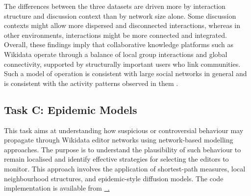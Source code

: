\documentclass[acmsmall,nonacm,natbib=false]{acmart}
\newcommand{\githublink}[2]{\href{#1}{\faGithub\ #2}}
\begin{document}
The differences between the three datasets are driven more by interaction structure and discussion
context than by network size alone. Some discussion contexts might allow more dispersed and disconnected interactions, whereas in other environments, interactions might be more connected and integrated.
Overall, these findings imply that collaborative knowledge platforms such as Wikidata operate through a balance of local group interactions and global connectivity, supported by structurally important users who link communities. Such a model of operation is consistent with large social networks in general and is consistent with the activity patterns observed in them \cite{leskovec2008planetary,newman2010networks}.



\subsection{\LARGE{Task C: Epidemic Models}}
This task aims at understanding how suspicious or controversial behaviour may propagate through Wikidata editor networks using network-based modelling approaches. The purpose is to understand the plausibility of such behaviour to remain localised and identify effective strategies for selecting the editors to monitor. This approach involves the application of shortest-path measures, local neighbourhood structures, and epidemic-style diffusion models. The code implementation is available from \githublink{https://github.kcl.ac.uk/k25038453/network-data-analysis-coursework/blob/main/notebooks/part\_1/taskC.ipynb}.
\end{document}
